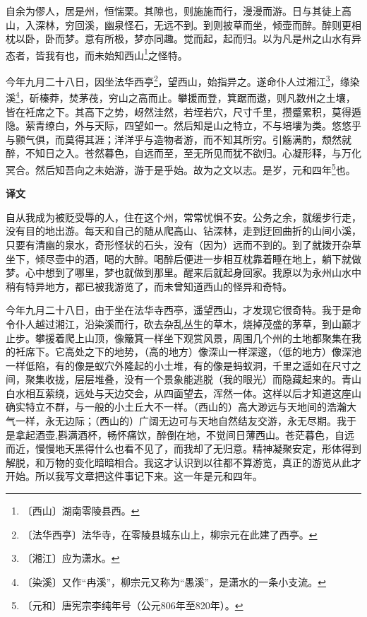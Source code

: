 \documentclass[12pt,UTF-8,openany,a4]{ctexbook}
\begin{document}
\begin{large}
    
    自余为僇人，居是州，恒惴栗。其隙也，则施施而行，漫漫而游。日与其徒上高山，入深林，穷回溪，幽泉怪石，无远不到。到则披草而坐，倾壶而醉。醉则更相枕以卧，卧而梦。意有所极，梦亦同趣。觉而起，起而归。以为凡是州之山水有异态者，皆我有也，而未始知西山\footnote{〔西山〕\yiwen 湖南零陵县西。}之怪特。
    
    今年九月二十八日，因坐法华西亭\footnote{〔法华西亭〕\yiwen 法华寺，在零陵县城东山上，柳宗元在此建了西亭。}，望西山，始指异之。遂命仆人过湘江\footnote{〔湘江〕\yiwen 应为潇水。}，缘染溪\footnote{〔染溪〕\yiwen 又作“冉溪”，柳宗元又称为“愚溪”，是潇水的一条小支流。}，斫榛莽，焚茅茷，穷山之高而止。攀援而登，箕踞而遨，则凡数州之土壤，皆在衽席之下。其高下之势，岈然洼然，若垤若穴，尺寸千里，攒蹙累积，莫得遁隐。萦青缭白，外与天际，四望如一。然后知是山之特立，不与培塿为类。悠悠乎与颢气俱，而莫得其涯；洋洋乎与造物者游，而不知其所穷。引觞满酌，颓然就醉，不知日之入。苍然暮色，自远而至，至无所见而犹不欲归。心凝形释，与万化冥合。然后知吾向之未始游，游于是乎始。故为之文以志。是岁，元和四年\footnote{〔元和〕\yiwen 唐宪宗李纯年号（公元806年至820年）。}也。
\end{large}


\newpage

\begin{Large}
    \noindent\textbf{译文}
\end{Large}


\vspace{1em}

\begin{large}
    \yiwen 
    自从我成为被贬受辱的人，住在这个州，常常忧惧不安。公务之余，就缓步行走，没有目的地出游。每天和自己的随从爬高山、钻深林，走到迂回曲折的山间小溪，只要有清幽的泉水，奇形怪状的石头，没有（因为）远而不到的。到了就拨开杂草坐下，倾尽壶中的酒，喝的大醉。喝醉后便进一步相互枕靠着睡在地上，躺下就做梦。心中想到了哪里，梦也就做到那里。醒来后就起身回家。我原以为永州山水中稍有特异地方，都已被我游览了，而未曾知道西山的怪异和奇特。
    
    今年九月二十八日，由于坐在法华寺西亭，遥望西山，才发现它很奇特。我于是命令仆人越过湘江，沿染溪而行，砍去杂乱丛生的草木，烧掉茂盛的茅草，到山巅才止步。攀援着爬上山顶，像簸箕一样坐下观赏风景，周围几个州的土地都聚集在我的衽席下。它高处之下的地势，（高的地方）像深山一样深邃，（低的地方）像深池一样低陷，有的像是蚁穴外隆起的小土堆，有的像是蚂蚁洞，千里之遥如在尺寸之间，聚集收拢，层层堆叠，没有一个景象能逃脱（我的眼光）而隐藏起来的。青山白水相互萦绕，远处与天边交会，从四面望去，浑然一体。这样以后才知道这座山确实特立不群，与一般的小土丘大不一样。（西山的）高大渺远与天地间的浩瀚大气一样，永无边际；（西山的）广阔无边可与天地自然结友交游，永无尽期。我于是拿起酒壶,斟满酒杯，畅怀痛饮，醉倒在地，不觉间日薄西山。苍茫暮色，自远而近，慢慢地天黑得什么也看不见了，而我却了无归意。精神凝聚安定，形体得到解脱，和万物的变化暗暗相合。我这才认识到以往都不算游览，真正的游览从此才开始。所以我写文章把这件事记下来。这一年是元和四年。
    
\end{large}
\end{document}
